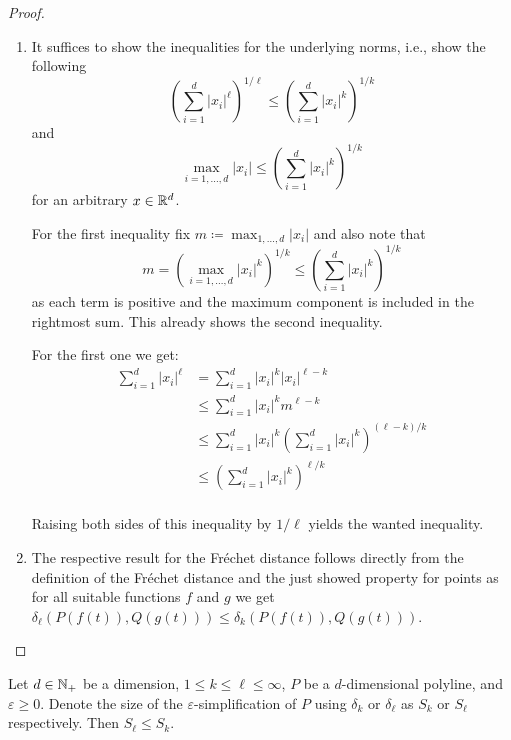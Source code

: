 \begin{proof}
  \begin{enumerate}
		\item It suffices to show the inequalities for the underlying norms, i.e., show the following 
			\[\left(\sum_{i=1}^d |x_i|^\ell\right)^{1/\ell} \leq \left(\sum_{i=1}^d |x_i|^k\right)^{1/k}\]
			and 
			\[\max_{i=1, \dots, d} |x_i| \leq \left(\sum_{i=1}^d |x_i|^k\right)^{1/k}\]
			for an arbitrary \(x \in \mathbb{R}^d\).

			For the first inequality fix \(m \coloneq \max_{1,\dots, d}|x_i|\) and also note that 
			\[m = \left(\max_{i=1, \dots, d} |x_i|^{k}\right)^{1/k} \leq \left(\sum_{i=1}^d |x_i|^{k}\right)^{1/k}\]
			as each term is positive and the maximum component is included in the rightmost sum. This already shows the second inequality.

			For the first one we get:
			\begin{align*}
				\sum_{i=1}^d |x_i|^\ell &= \sum_{i=1}^d |x_i|^k|x_i|^{\ell - k} \\
				 &\leq \sum_{i=1}^d |x_i|^k m^{\ell - k} \\
				 &\leq \sum_{i=1}^d |x_i|^k \left(\sum_{i=1}^d |x_i|^{k}\right)^{(\ell-k)/k} \\
				 &\leq \left(\sum_{i=1}^d |x_i|^{k}\right)^{\ell/k} \\
			\end{align*}
			
			Raising both sides of this inequality by \(1/\ell\) yields the wanted inequality.

		\item The respective result for the Fréchet distance follows directly from the definition of the Fréchet distance and the just showed property for points as for all suitable functions \(f\) and \(g\) we get \(\delta_\ell(P(f(t)), Q(g(t))) \leq \delta_k(P(f(t)), Q(g(t)))\).
  \end{enumerate}
\end{proof}

\begin{corollary}\label{cor:size_monotonicity}
	Let \(d \in \mathbb{N}_+\) be a dimension, \(1 \leq k \leq \ell \leq \infty\),
  \(P\) be a \(d\)-dimensional polyline, and \(\varepsilon \geq 0\). Denote the size of the \(\varepsilon\)-simplification of \(P\) using \(\delta_k\) or \(\delta_\ell\) as \(S_k\) or \(S_\ell\) respectively. Then \(S_\ell \leq S_k\).
\end{corollary}

